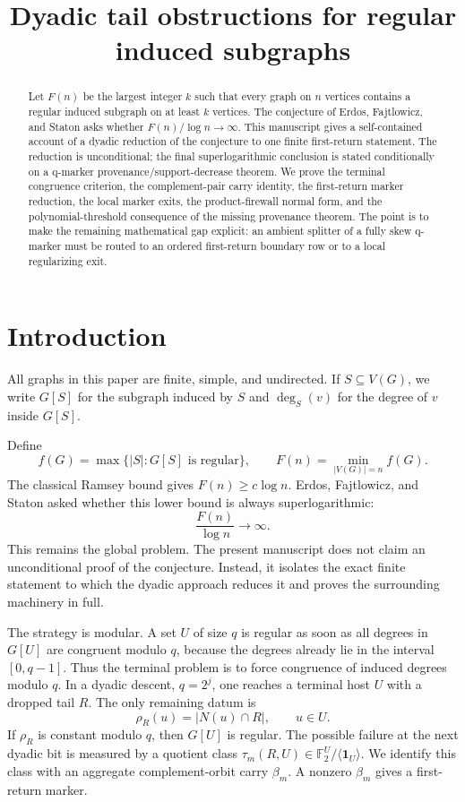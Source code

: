 \documentclass[11pt]{article}
\title{Dyadic tail obstructions for regular induced subgraphs}
\author{}
\date{}
\theoremstyle{remark}
\newcommand{\F}{\mathbb F}
\newcommand{\one}{\mathbf 1}
\begin{document}
\maketitle

\begin{abstract}
Let \(F(n)\) be the largest integer \(k\) such that every graph on \(n\)
vertices contains a regular induced subgraph on at least \(k\) vertices.  The
conjecture of Erdos, Fajtlowicz, and Staton asks whether
\(F(n)/\log n\to\infty\).  This manuscript gives a self-contained account of a
dyadic reduction of the conjecture to one finite first-return statement.  The
reduction is unconditional; the final superlogarithmic conclusion is stated
conditionally on a q-marker provenance/support-decrease theorem.  We prove the
terminal congruence criterion, the complement-pair carry identity, the
first-return marker reduction, the local marker exits, the product-firewall
normal form, and the polynomial-threshold consequence of the missing
provenance theorem.  The point is to make the remaining mathematical gap
explicit: an ambient splitter of a fully skew q-marker must be routed to an
ordered first-return boundary row or to a local regularizing exit.
\end{abstract}

\tableofcontents

\section{Introduction}

All graphs in this paper are finite, simple, and undirected.  If
\(S\subseteq V(G)\), we write \(G[S]\) for the subgraph induced by \(S\) and
\(\deg_S(v)\) for the degree of \(v\) inside \(G[S]\).

Define
\[
  f(G)=\max\{|S|:G[S]\text{ is regular}\},\qquad
  F(n)=\min_{|V(G)|=n} f(G).
\]
The classical Ramsey bound gives \(F(n)\ge c\log n\).  Erdos,
Fajtlowicz, and Staton asked whether this lower bound is always
superlogarithmic:
\[
  \frac{F(n)}{\log n}\longrightarrow\infty .
\]
This remains the global problem.  The present manuscript does not claim an
unconditional proof of the conjecture.  Instead, it isolates the exact finite
statement to which the dyadic approach reduces it and proves the surrounding
machinery in full.

The strategy is modular.  A set \(U\) of size \(q\) is regular as soon as all
degrees in \(G[U]\) are congruent modulo \(q\), because the degrees already lie
in the interval \([0,q-1]\).  Thus the terminal problem is to force congruence
of induced degrees modulo \(q\).  In a dyadic descent, \(q=2^j\), one reaches a
terminal host \(U\) with a dropped tail \(R\).  The only remaining datum is
\[
  \rho_R(u)=|N(u)\cap R|,\qquad u\in U.
\]
If \(\rho_R\) is constant modulo \(q\), then \(G[U]\) is regular.  The possible
failure at the next dyadic bit is measured by a quotient class
\(\tau_m(R,U)\in \F_2^U/\langle\one_U\rangle\).  We identify this class with an
aggregate complement-orbit carry \(\beta_m\).  A nonzero \(\beta_m\) gives a
first-return marker.
\end{document}
